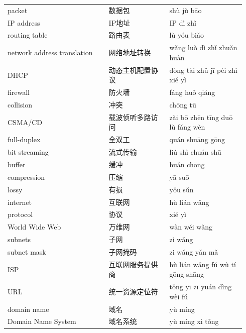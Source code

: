 \documentclass[11pt]{article}
\begin{document}
\begin{longtable}{@{}p{0.40\linewidth}p{0.24\linewidth}p{0.30\linewidth}@{}}
packet & 数据包 & shù jù bāo \\
IP address & IP地址 & IP dì zhǐ \\
routing table & 路由表 & lù yóu biǎo \\
network address translation & 网络地址转换 & wǎng luò dì zhǐ zhuǎn huàn \\
DHCP & 动态主机配置协议 & dòng tài zhǔ jī pèi zhì xié yì \\
firewall & 防火墙 & fáng huǒ qiáng \\
collision & 冲突 & chōng tū \\
CSMA/CD & 载波侦听多路访问 & zài bō zhēn tīng duō lù fǎng wèn \\
full-duplex & 全双工 & quán shuāng gōng \\
bit streaming & 流式传输 & liú shì chuán shū \\
buffer & 缓冲 & huǎn chōng \\
compression & 压缩 & yā suō \\
lossy & 有损 & yǒu sǔn \\
internet & 互联网 & hù lián wǎng \\
protocol & 协议 & xié yì \\
World Wide Web & 万维网 & wàn wéi wǎng \\
subnets & 子网 & zi wǎng \\
subnet mask & 子网掩码 & zi wǎng yǎn mǎ \\
ISP & 互联网服务提供商 & hù lián wǎng fú wù tí gōng shāng \\
URL & 统一资源定位符 & tǒng yī zī yuán dìng wèi fú \\
domain name & 域名 & yù míng \\
Domain Name System & 域名系统 & yù míng xì tǒng \\
\end{longtable}
\end{document}
